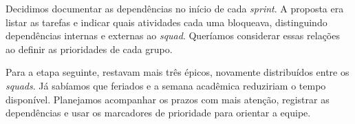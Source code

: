 Decidimos documentar as dependências no início de cada \textit{sprint}.
A proposta era listar as tarefas e indicar quais atividades cada uma
bloqueava, distinguindo dependências internas e externas ao \textit{squad}.
Queríamos considerar essas relações ao definir as prioridades de cada grupo.

Para a etapa seguinte, restavam mais três épicos, novamente distribuídos
entre os \textit{squads}. Já sabíamos que feriados e a semana acadêmica
reduziriam o tempo disponível. Planejamos acompanhar os prazos com mais
atenção, registrar as dependências e usar os marcadores de prioridade para
orientar a equipe.

